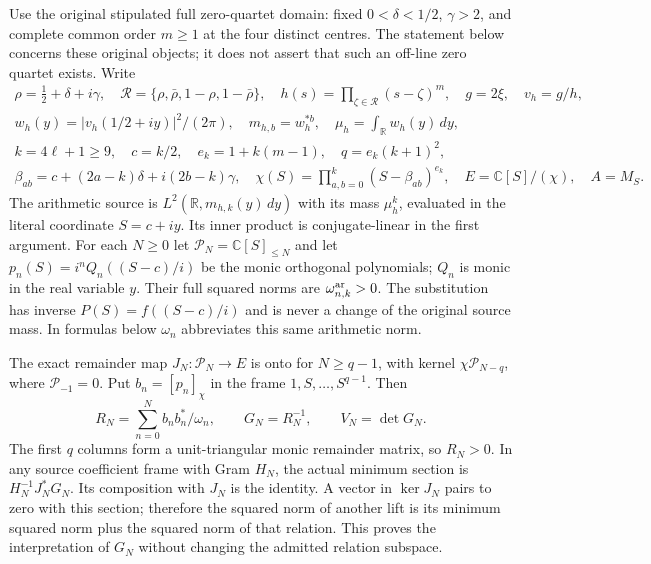 Use the original stipulated full zero-quartet domain: fixed
$0<\delta<1/2$, $\gamma>2$, and complete common order $m\ge1$ at the four
distinct centres. The statement below concerns these original objects; it
does not assert that such an off-line zero quartet exists. Write
\[
\begin{gathered}
 \rho=\tfrac12+\delta+i\gamma,\quad
 \mathcal R=\{\rho,\bar\rho,1-\rho,1-\bar\rho\},\quad
 h(s)=\prod_{\zeta\in\mathcal R}(s-\zeta)^m,\quad g=2\xi,\quad v_h=g/h,\\
 w_h(y)=|v_h(1/2+iy)|^2/(2\pi),\quad m_{h,b}=w_h^{*b},\quad
 \mu_h=\int_{\mathbb R}w_h(y)\,dy,\\
 k=4\ell+1\ge9,\quad c=k/2,\quad e_k=1+k(m-1),\quad
 q=e_k(k+1)^2,\\
 \beta_{ab}=c+(2a-k)\delta+i(2b-k)\gamma,\quad
 \chi(S)=\prod_{a,b=0}^{k}(S-\beta_{ab})^{e_k},\quad
 E=\mathbb C[S]/(\chi),\quad A=M_S.
\end{gathered}\tag{CAI1}
\]
The arithmetic source is $L^2(\mathbb R,m_{h,k}(y)\,dy)$ with its
mass $\mu_h^k$, evaluated in the literal coordinate $S=c+iy$.
Its inner product is conjugate-linear in the first argument. For each
$N\ge0$ let $\mathcal P_N=\mathbb C[S]_{\le N}$ and let
$p_n(S)=i^nQ_n((S-c)/i)$ be the monic orthogonal polynomials; $Q_n$ is
monic in the real variable $y$. Their full squared norms are
$\omega_{n,k}^{\rm ar}>0$. The substitution has inverse
$P(S)=f((S-c)/i)$ and is never a change of the original source mass.
In formulas below $\omega_n$ abbreviates this same arithmetic norm.

The exact remainder map $J_N:\mathcal P_N\to E$ is onto for
$N\ge q-1$, with kernel $\chi\mathcal P_{N-q}$, where
$\mathcal P_{-1}=0$. Put $b_n=[p_n]_\chi$ in the frame
$1,S,\ldots,S^{q-1}$. Then
\[
 R_N=\sum_{n=0}^N b_nb_n^*/\omega_n,\qquad
 G_N=R_N^{-1},\qquad V_N=\det G_N.\tag{CAI2}
\]
The first $q$ columns form a unit-triangular monic remainder matrix, so
$R_N>0$. In any source coefficient frame with Gram $H_N$, the actual
minimum section is $H_N^{-1}J_N^*G_N$. Its composition with $J_N$ is the
identity. A vector in $\ker J_N$ pairs to zero with this section;
therefore the squared norm of another lift is its minimum squared norm
plus the squared norm of that relation. This proves the interpretation
of $G_N$ without changing the admitted relation subspace.

